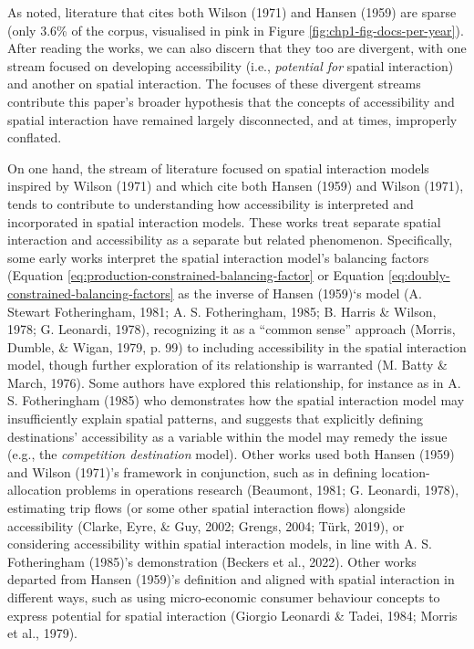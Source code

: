 \documentclass[
11pt, %
oneside, %
english, %
singlespacing, %
]{macthesis} %
\begin{document}
As noted, literature that cites both Wilson (1971) and Hansen (1959) are sparse (only 3.6\% of the corpus, visualised in pink in Figure \ref{fig:chp1-fig-docs-per-year}). After reading the works, we can also discern that they too are divergent, with one stream focused on developing accessibility (i.e., \emph{potential for} spatial interaction) and another on spatial interaction. The focuses of these divergent streams contribute this paper's broader hypothesis that the concepts of accessibility and spatial interaction have remained largely disconnected, and at times, improperly conflated.

On one hand, the stream of literature focused on spatial interaction models inspired by Wilson (1971) and which cite both Hansen (1959) and Wilson (1971), tends to contribute to understanding how accessibility is interpreted and incorporated in spatial interaction models. These works treat separate spatial interaction and accessibility as a separate but related phenomenon. Specifically, some early works interpret the spatial interaction model's balancing factors (Equation \ref{eq:production-constrained-balancing-factor} or Equation \ref{eq:doubly-constrained-balancing-factors} as the inverse of Hansen (1959)`s model (A. Stewart Fotheringham, 1981; A. S. Fotheringham, 1985; B. Harris \& Wilson, 1978; G. Leonardi, 1978), recognizing it as a ``common sense'' approach (Morris, Dumble, \& Wigan, 1979, p. 99) to including accessibility in the spatial interaction model, though further exploration of its relationship is warranted (M. Batty \& March, 1976). Some authors have explored this relationship, for instance as in A. S. Fotheringham (1985) who demonstrates how the spatial interaction model may insufficiently explain spatial patterns, and suggests that explicitly defining destinations' accessibility as a variable within the model may remedy the issue (e.g., the \emph{competition destination} model). Other works used both Hansen (1959) and Wilson (1971)'s framework in conjunction, such as in defining location-allocation problems in operations research (Beaumont, 1981; G. Leonardi, 1978), estimating trip flows (or some other spatial interaction flows) alongside accessibility (Clarke, Eyre, \& Guy, 2002; Grengs, 2004; Türk, 2019), or considering accessibility within spatial interaction models, in line with A. S. Fotheringham (1985)'s demonstration (Beckers et al., 2022). Other works departed from Hansen (1959)'s definition and aligned with spatial interaction in different ways, such as using micro-economic consumer behaviour concepts to express potential for spatial interaction (Giorgio Leonardi \& Tadei, 1984; Morris et al., 1979).
\end{document}

